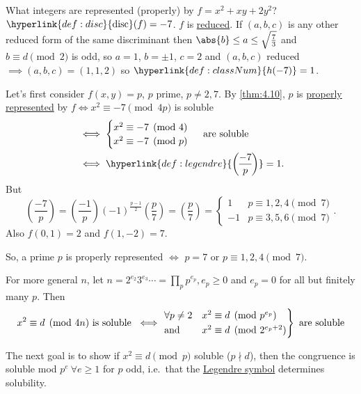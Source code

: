 \documentclass{article}
\newcommand{\legendre}[2]{\genfrac{(}{)}{}{}{#1}{#2}}
\DeclareMathOperator{\disc}{disc}
\begin{document}
\begin{eg}
    What integers are represented (properly) by $f = x^2 + xy + 2y^2$? $\hyperlink{def:disc}{\disc}(f) = -7$.
    $f$ is \hyperlink{def:reduced}{reduced}.
    If $(a, b, c)$ is any other reduced form of the same discriminant then $\abs{b} \leq a \leq \sqrt{\frac{7}{3}}$ and $b \equiv d \pmod{2}$ is odd, so $a = 1$, $b = \pm 1$, $c = 2$ and $(a, b, c)$ reduced $\implies (a, b, c) = (1, 1, 2)$ so $\hyperlink{def:classNum}{h(-7)} = 1$.

    Let's first consider $f(x,y) = p$, $p$ prime, $p \neq 2, 7$.
    By \cref{thm:4.10}, $p$ is \hyperlink{def:propRep}{properly represented} by $f \iff x^2 \equiv -7 \pmod{4p}$ is soluble
    \begin{align*}
        &\iff \begin{cases} x^2 \equiv -7 \pmod{4} \\ x^2 \equiv -7 \pmod{p}\end{cases} \text{ are soluble} \\
        &\iff \hyperlink{def:legendre}{\legendre{-7}{p}} = 1.
    \end{align*}
    But
    \begin{equation*}
        \legendre{-7}{p} = \legendre{-1}{p} (-1)^\frac{p-1}{2} \legendre{p}{7} = \legendre{p}{7} = \begin{cases}1 & p \equiv 1,2,4 \pmod{7} \\ -1 & p \equiv 3,5,6 \pmod{7}\end{cases}.
    \end{equation*}
    Also $f(0, 1) = 2$ and $f(1, -2) = 7$.

    So, a prime $p$ is properly represented $\iff$ $p = 7 \text{ or } p \equiv 1, 2, 4 \pmod{7}$.
\end{eg}
For more general $n$, let $n = 2^{e_2} 3^{e_3}\dotsm= \prod_p p^{e_p}, e_p \geq 0$ and $e_p = 0$ for all but finitely many $p$.
Then
\begin{equation*}
    x^2 \equiv d \pmod{4n}\text{ is soluble } \iff
    \begin{rcases}
        \forall p \neq 2 & x^2 \equiv d \pmod{p^{e_p}} \\
        \text{and} & x^2 \equiv d \pmod{2^{e_p + 2}}
    \end{rcases}
    \text{ are soluble}
\end{equation*}

The next goal is to show if $x^2 \equiv d \pmod{p}$ soluble ($p \nmid d$), then the congruence is soluble mod $p^e\ \forall e \geq 1$ for $p$ odd, i.e.\ that the \hyperlink{def:legendre}{Legendre symbol} determines solubility.
\end{document}
